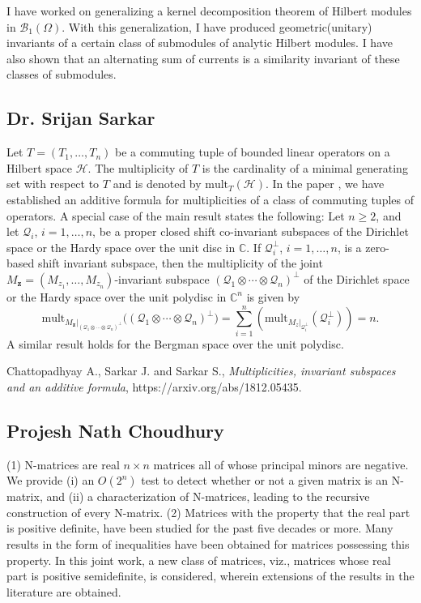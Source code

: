 I have worked on generalizing a kernel decomposition theorem of Hilbert modules in $\mathcal{B}_1(\Omega)$. With this generalization, I have produced geometric(unitary) invariants of a certain class of submodules of analytic Hilbert modules. I have also shown that an alternating sum of currents is a similarity invariant of these classes of submodules.


\subsection{Dr. Srijan Sarkar}

  Let $T = (T_1, \ldots, T_n)$ be a commuting tuple of bounded linear operators on a Hilbert space $\mathcal{H}$. The multiplicity of $T$ is the cardinality of a minimal generating set with respect to $T$ and is denoted by $\mbox{mult}_{T}(\mathcal{H})$. In the paper \cite{CSS}, we have established an additive formula for multiplicities of a class of commuting tuples of operators. A special case of the main result states the following: Let $n \geq 2$, and let $\mathcal{Q}_i$, $i = 1, \ldots, n$, be a proper closed shift co-invariant subspaces of the Dirichlet space or the Hardy space over the unit disc in $\mathbb{C}$. If $\mathcal{Q}_i^{\perp}$, $i = 1, \ldots, n$, is a zero-based shift invariant subspace, then the multiplicity of the joint $M_{\bm z} = (M_{z_1}, \ldots, M_{z_n})$-invariant subspace $(\mathcal{Q}_1 \otimes \cdots \otimes \mathcal{Q}_n)^{\perp}$ of the Dirichlet space or the Hardy space over the unit polydisc in $\mathbb{C}^n$ is given by \[ \mbox{mult}_{M_{\bm z}|_{ (\mathcal{Q}_1 \otimes \cdots \otimes \mathcal{Q}_n)^\perp}} \big((\mathcal{Q}_1 \otimes \cdots \otimes \mathcal{Q}_n)^\perp \big) = \sum_{i=1}^n (\mbox{mult}_{M_z|_{\mathcal{Q}_i^{\perp}}} (\mathcal{Q}_i^{\perp})) = n. \] A similar result holds for the Bergman space over the unit polydisc.  \begin{thebibliography}{99}   Chattopadhyay A., Sarkar J. and Sarkar S., {\em Multiplicities, invariant subspaces and an additive formula}, https://arxiv.org/abs/1812.05435.  \end{thebibliography}   


\subsection{Projesh Nath Choudhury}

(1)  N-matrices are real $n\times n$ matrices all of whose principal  minors are negative. We provide (i) an $O(2^n)$ test to detect whether or not a given matrix is an N-matrix, and (ii) a characterization of N-matrices, leading to the recursive construction of every N-matrix.  (2) Matrices with the property that the real part is positive definite, have been studied for the past five decades or more. Many results in the form of inequalities have been obtained for matrices possessing this property. In this joint work, a new class of matrices, viz., matrices whose real part is positive semidefinite, is considered, wherein extensions of the results in the literature are obtained.


